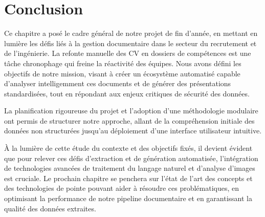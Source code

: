 \section{Conclusion}
Ce chapitre a posé le cadre général de notre projet de fin d'année, en mettant en lumière les défis liés à la gestion documentaire dans le secteur du recrutement et de l'ingénierie. La refonte manuelle des CV en dossiers de compétences est une tâche chronophage qui freine la réactivité des équipes. Nous avons défini les objectifs de notre mission, visant à créer un écosystème automatisé capable d'analyser intelligemment ces documents et de générer des présentations standardisées, tout en répondant aux enjeux critiques de sécurité des données.

La planification rigoureuse du projet et l'adoption d'une méthodologie modulaire ont permis de structurer notre approche, allant de la compréhension initiale des données non structurées jusqu'au déploiement d'une interface utilisateur intuitive.

À la lumière de cette étude du contexte et des objectifs fixés, il devient évident que pour relever ces défis d'extraction et de génération automatisée, l'intégration de technologies avancées de traitement du langage naturel et d'analyse d'images est cruciale. Le prochain chapitre se penchera sur l'état de l'art des concepts et des technologies de pointe pouvant aider à résoudre ces problématiques, en optimisant la performance de notre pipeline documentaire et en garantissant la qualité des données extraites.
